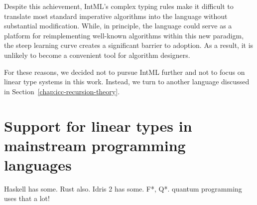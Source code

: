 Despite this achievement, IntML's complex typing rules make it difficult to translate most standard imperative algorithms into the language without substantial modification. While, in principle, the language could serve as a platform for reimplementing well-known algorithms within this new paradigm, the steep learning curve creates a significant barrier to adoption. As a result, it is unlikely to become a convenient tool for algorithm designers.

For these reasons, we decided not to pursue IntML further and not to focus on linear type systems in this work. Instead, we turn to another language discussed in Section~\ref{chap:icc-recursion-theory}.

\section{Support for linear types in mainstream programming languages}
Haskell has some. Rust also. Idris 2 has some. F*, Q*. quantum programming uses that a lot!